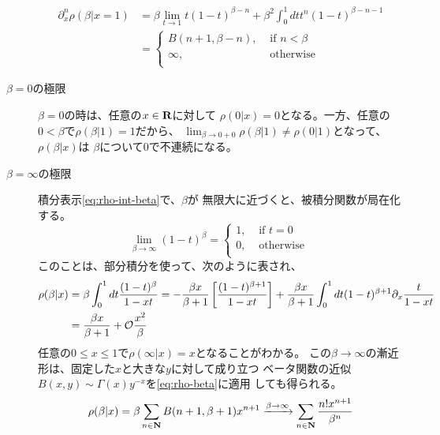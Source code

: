 \begin{description}
	\begin{equation*}\begin{split}
		\partial_x^n\rho(\beta|x=1)
		&= \beta \lim_{t\to1} t(1 - t)^{\beta - n}
			+ \beta^2\int_0^1 dt t^n(1 - t)^{\beta - n - 1} \\
		&= \begin{cases}
			B(n + 1, \beta - n), &\text{ if } n < \beta \\
			\infty, &\text{ otherwise } \\
		\end{cases}
	\end{split}\end{equation*}
	\item[$\beta=0$の極限] $\beta=0$の時は、任意の$x\in\mathbf{R}$に対して
	$\rho(0|x)=0$となる。一方、任意の$0<\beta$で$\rho(\beta|1)=1$だから、
	$\lim_{\beta\to0+0}\rho(\beta|1)\neq\rho(0|1)$となって、$\rho(\beta|x)$は
	$\beta$について$0$で不連続になる。
	\item[$\beta=\infty$の極限] 積分表示\eqref{eq:rho-int-beta}で、$\beta$が
	無限大に近づくと、被積分関数が局在化する。
	\begin{equation*}
		\lim_{\beta\to\infty}(1 - t)^\beta = \begin{cases}
			1, &\text{ if } t = 0 \\
			0, &\text{ otherwise } \\
		\end{cases}
	\end{equation*}
	このことは、部分積分を使って、次のように表され、
	\begin{equation*}\begin{split}
		\rho(\beta|x) &= \beta\int_0^1 dt\frac{(1 - t)^\beta}{1 - xt}
		= - \frac{\beta x}{\beta + 1}\mathinner{\left[{\frac{(1 - t)^{\beta + 1}}{1 - xt}}\right]}
			+ \frac{\beta x}{\beta + 1}\int_0^1 dt (1 - t)^{\beta + 1}
			\partial_x\frac{t}{1 -xt} \\
		&= \frac{\beta x}{\beta + 1} + \mathcal{O}\frac{x^2}{\beta}
	\end{split}\end{equation*}
	任意の$0\le x\le 1$で$\rho(\infty|x) = x$となることがわかる。
	この$\beta\to\infty$の漸近形は、固定した$x$と大きな$y$に対して成り立つ
	ベータ関数の近似$B(x,y)\sim \Gamma(x)y^{-x}$を\eqref{eq:rho-beta}に適用
	しても得られる。
	\begin{equation*}
		\rho(\beta|x) = \beta\sum_{n\in\mathbf{N}} B(n + 1, \beta + 1)x^{n+1}
		\xrightarrow[{}]{\beta\to\infty} \sum_{n\in\mathbf{N}}\frac{n!x^{n + 1}}{\beta^n}
	\end{equation*}
\end{description} %
